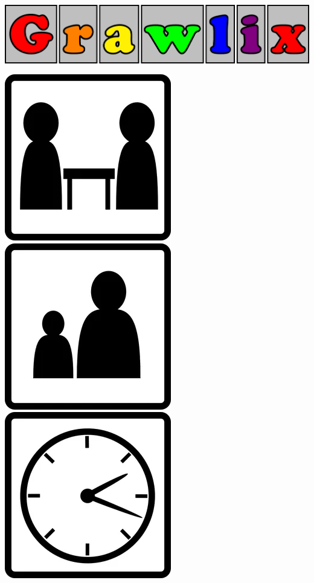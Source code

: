 \documentclass[a5paper, DIV=18, 12pt]{scrartcl}
\begin{document}
\enlargethispage{1\baselineskip}
\vspace{-1ex}
\begin{center}
\includegraphics[width=\textwidth]{Images/fancy_title.png}
\setmainfont[Scale=5.455]{Earthquake MF}
\end{center}
\vspace{-0.0ex}
\includegraphics[scale=0.125]{Images/Icons/player_count_icon.png} {\setmainfont[Scale=1.4]{Quicksand-Bold}\Huge \raisebox{6.55pt}{\textcolor{black}{:\ 2}}} \hfill \includegraphics[scale=0.125]{Images/Icons/player_age_icon.png} {\setmainfont[Scale=1.4]{Quicksand-Bold}\Huge \raisebox{6.55pt}{\textcolor{black}{:\ 8+}}}\hfill \includegraphics[scale=0.125]{Images/Icons/playtime_icon.png} {\setmainfont[Scale=1.4]{Quicksand-Bold}\Huge \raisebox{6.55pt}{\textcolor{black}{:\ 15-30}}}
\end{document}
